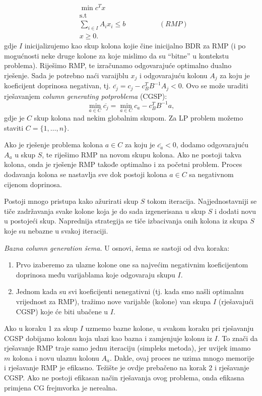 \documentclass[a4paper, utf8, 11pt, colorlinks]{book}
\begin{document}
\begin{align*}
    &\min c^T x \\
    &\mbox{s.t} \\
    & \sum_{i \in I} A_i x_i  \leq b \hspace{2cm} (RMP)\\
    & x \geq 0. 
\end{align*}
gdje $I$ inicijalizujemo kao skup kolona kojie čine inicijalno BDR za RMP (i po mogućnosti neke druge kolone za koje mislimo da su ``bitne'' u kontekstu problema).  Riješimo RMP,  te izračunamo odgovarajuće optimalno dualno rješenje. Sada je potrebno naći varaijblu $x_j$ i odgovarajuću kolonu $A_j$ za koju je koeficijent doprinosa negativan, tj. $\overline{c_j} = c_j - c_B^T B^{-1}A_j < 0$.
Ovo se može uraditi rješavanjem \emph{column generating potproblema} (CGSP):
$$\min_{a \in C} \overline{c_j} = \min_{a \in C} c_a - c_B^T B^{-1} a,$$
gdje je $C$ skup kolona nad nekim globalnim skupom. Za LP problem možemo staviti $C = \{1,\ldots,n\}$. 

Ako je rješenje problema kolona $a \in C$ za koju je $\overline{c_a}<0$, dodamo odgovarajuću $A_a$ u skup $S$, te riješimo  RMP na novom skupu kolona. Ako ne postoji takva kolona, onda je rješenje RMP takođe optimalno i za početni problem. %
 Proces dodavanja kolona se nastavlja sve dok postoji kolona $a\in C$ sa negativnom cijenom doprinosa. 

Postoji mnogo pristupa kako ažurirati skup $S$ tokom iteracija. 
Najjednostavniji se tiče zadržavanja svake kolone koja je do sada izgenerisana  u skup $S$ i dodati novu u postojeći skup. Naprednija strategija se tiče izbacivanja onih kolona iz skupa $S$ koje su nebazne u svakoj iteraciji. 

\emph{Bazna column generation šema.} U osnovi, šema se sastoji od dva koraka:
\begin{enumerate}
	\item Prvo izaberemo za ulazne kolone one sa najvećim negativnim koeficijentom doprinosa među varijablama koje odgovaraju skupu $I$.
	\item Jednom kada su svi koeficijenti nenegativni (tj. kada smo našli optimalnu vrijednost za  RMP), tražimo nove varijable (kolone) van skupa $I$ (rješavajući CGSP) koje će biti ubačene u $I$. 
\end{enumerate}
Ako u koraku 1 za skup $I$ uzmemo bazne kolone, u svakom koraku pri rješavanju CGSP dobijamo kolonu koja ulazi kao bazna i zamjenjuje kolonu iz $I$. To znači da rješavanje RMP traje samo jednu iteraciju (simpleks metoda), jer uvijek imamo $m$ kolona i novu ulaznu kolonu $A_a$. Dakle, ovaj proces ne uzima mnogo memorije i rješavanje RMP je efikasno. Težište je ovdje prebačeno na korak 2 i rješavanje CGSP. Ako ne postoji efikasan način rješavanja ovog problema, onda efikasna primjena CG frejmvorka je nerealna.  
 
\end{document}
